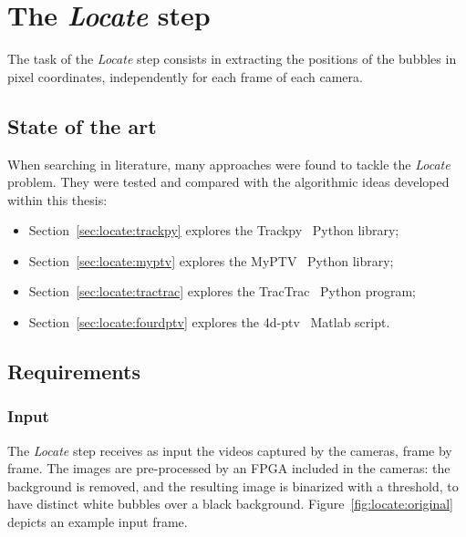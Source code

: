 \chapter{The \textit{Locate} step}
\label{chap:locate}

\newcommand{\locateimgsize}{0.9\textwidth}

The task of the \textit{Locate} step consists in extracting the positions of the bubbles in pixel coordinates, independently for each frame of each camera.

\section{State of the art}

When searching in literature, many approaches were found to tackle the \textit{Locate} problem.
They were tested and compared with the algorithmic ideas developed within this thesis:
\begin{itemize}
	\itemsep 0em
	\item Section~\ref{sec:locate:trackpy} explores the Trackpy~\cite{trackpy} Python library;
	\item Section~\ref{sec:locate:myptv} explores the MyPTV~\cite{myptv} Python library;
	\item Section~\ref{sec:locate:tractrac} explores the TracTrac~\cite{tractrac} Python program;
	\item Section~\ref{sec:locate:fourdptv} explores the 4d-ptv~\cite{fourdptv} Matlab script.
\end{itemize}

\section{Requirements}

\subsection{Input}
The \textit{Locate} step receives as input the videos captured by the cameras, frame by frame.
The images are pre-processed by an FPGA included in the cameras: the background is removed, and the resulting image is binarized with a threshold, to have distinct white bubbles over a black background.
Figure~\ref{fig:locate:original} depicts an example input frame.

